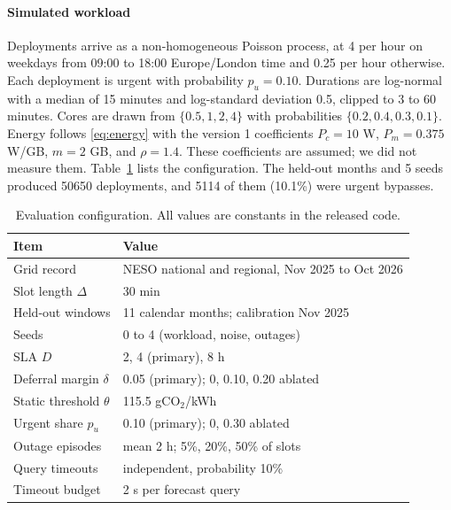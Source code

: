 \documentclass[journal]{IEEEtran}
\begin{document}
\paragraph{Simulated workload} Deployments arrive as a non-homogeneous Poisson process, at 4 per hour on weekdays from 09:00 to 18:00 Europe/London time and 0.25 per hour otherwise. Each deployment is urgent with probability $p_u = 0.10$. Durations are log-normal with a median of 15 minutes and log-standard deviation 0.5, clipped to 3 to 60 minutes. Cores are drawn from $\{0.5, 1, 2, 4\}$ with probabilities $\{0.2, 0.4, 0.3, 0.1\}$. Energy follows \eqref{eq:energy} with the version 1 coefficients $P_c = 10$ W, $P_m = 0.375$ W/GB, $m = 2$ GB, and $\rho = 1.4$. These coefficients are assumed; we did not measure them. Table~\ref{tab:config} lists the configuration. The held-out months and 5 seeds produced 50650 deployments, and 5114 of them (10.1\%) were urgent bypasses.

\begin{table}[!t]
\caption{Evaluation configuration. All values are constants in the released code.}
\label{tab:config}
\centering
\footnotesize
\begin{tabular}{@{}ll@{}}
\toprule
Item & Value \\
\midrule
Grid record & NESO national and regional, Nov 2025 to Oct 2026 \\
Slot length $\Delta$ & 30 min \\
Held-out windows & 11 calendar months; calibration Nov 2025 \\
Seeds & 0 to 4 (workload, noise, outages) \\
SLA $D$ & 2, 4 (primary), 8 h \\
Deferral margin $\delta$ & 0.05 (primary); 0, 0.10, 0.20 ablated \\
Static threshold $\theta$ & 115.5 gCO$_2$/kWh \\
Urgent share $p_u$ & 0.10 (primary); 0, 0.30 ablated \\
Outage episodes & mean 2 h; 5\%, 20\%, 50\% of slots \\
Query timeouts & independent, probability 10\% \\
Timeout budget & 2 s per forecast query \\
\bottomrule
\end{tabular}
\end{table}
\end{document}
